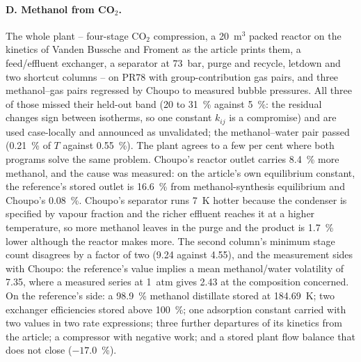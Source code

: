 \documentclass[11pt,a4paper]{article}
\begin{document}
\paragraph{D. Methanol from CO$_2$.}  The whole plant -- four-stage CO$_2$
compression, a 20~m$^3$ packed reactor on the kinetics of Vanden Bussche
and Froment as the article prints them, a feed/effluent exchanger, a
separator at 73~bar, purge and recycle, letdown and two shortcut columns --
on PR78 with group-contribution gas pairs, and three methanol--gas pairs
regressed by Choupo to measured bubble pressures.  All three of those
missed their held-out band (20 to 31~\% against 5~\%: the residual changes
sign between isotherms, so one constant $k_{ij}$ is a compromise) and are
used case-locally and announced as unvalidated; the methanol--water pair
passed (0.21~\% of $T$ against 0.55~\%).  The plant agrees to a few per cent
where both programs solve the same problem.  Choupo's reactor outlet
carries 8.4~\% more methanol, and the cause was measured: on the article's
own equilibrium constant, the reference's stored outlet is 16.6~\% from
methanol-synthesis equilibrium and Choupo's 0.08~\%.  Choupo's separator
runs 7~K hotter because the condenser is specified by vapour fraction and
the richer effluent reaches it at a higher temperature, so more methanol
leaves in the purge and the product is 1.7~\% lower although the reactor
makes more.  The second column's minimum stage count disagrees by a factor
of two (9.24 against 4.55), and the measurement sides with Choupo: the
reference's value implies a mean methanol/water volatility of 7.35, where
a measured series at 1~atm gives 2.43 at the composition concerned.  On
the reference's side: a 98.9~\% methanol distillate stored at 184.69~K;
two exchanger efficiencies stored above 100~\%; one adsorption
constant carried with two values in two rate expressions; three further
departures of its kinetics from the article; a compressor with negative
work; and a stored plant flow balance that does not close ($-17.0$~\%).
\end{document}
